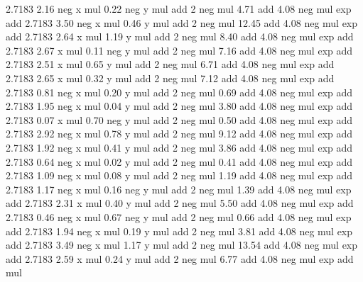 2.7183 2.16 neg x mul 0.22 neg y mul add 2 neg mul 4.71 add 4.08 neg mul exp add %
2.7183 3.50 neg x mul 0.46 y mul add 2 neg mul 12.45 add 4.08 neg mul exp add %
2.7183 2.64 x mul 1.19 y mul add 2 neg mul 8.40 add 4.08 neg mul exp add %
2.7183 2.67 x mul 0.11 neg y mul add 2 neg mul 7.16 add 4.08 neg mul exp add %
2.7183 2.51 x mul 0.65 y mul add 2 neg mul 6.71 add 4.08 neg mul exp add %
2.7183 2.65 x mul 0.32 y mul add 2 neg mul 7.12 add 4.08 neg mul exp add %
2.7183 0.81 neg x mul 0.20 y mul add 2 neg mul 0.69 add 4.08 neg mul exp add %
2.7183 1.95 neg x mul 0.04 y mul add 2 neg mul 3.80 add 4.08 neg mul exp add %
2.7183 0.07 x mul 0.70 neg y mul add 2 neg mul 0.50 add 4.08 neg mul exp add %
2.7183 2.92 neg x mul 0.78 y mul add 2 neg mul 9.12 add 4.08 neg mul exp add %
2.7183 1.92 neg x mul 0.41 y mul add 2 neg mul 3.86 add 4.08 neg mul exp add %
2.7183 0.64 neg x mul 0.02 y mul add 2 neg mul 0.41 add 4.08 neg mul exp add %
2.7183 1.09 neg x mul 0.08 y mul add 2 neg mul 1.19 add 4.08 neg mul exp add %
2.7183 1.17 neg x mul 0.16 neg y mul add 2 neg mul 1.39 add 4.08 neg mul exp add %
2.7183 2.31 x mul 0.40 y mul add 2 neg mul 5.50 add 4.08 neg mul exp add %
2.7183 0.46 neg x mul 0.67 neg y mul add 2 neg mul 0.66 add 4.08 neg mul exp add %
2.7183 1.94 neg x mul 0.19 y mul add 2 neg mul 3.81 add 4.08 neg mul exp add %
2.7183 3.49 neg x mul 1.17 y mul add 2 neg mul 13.54 add 4.08 neg mul exp add %
2.7183 2.59 x mul 0.24 y mul add 2 neg mul 6.77 add 4.08 neg mul exp add mul%
